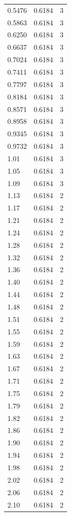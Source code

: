 \begin{longtable}{lrr}
  0.5476 & 0.6184 & 3 \\
  0.5863 & 0.6184 & 3 \\
  0.6250 & 0.6184 & 3 \\
  0.6637 & 0.6184 & 3 \\
  0.7024 & 0.6184 & 3 \\
  0.7411 & 0.6184 & 3 \\
  0.7797 & 0.6184 & 3 \\
  0.8184 & 0.6184 & 3 \\
  0.8571 & 0.6184 & 3 \\
  0.8958 & 0.6184 & 3 \\
  0.9345 & 0.6184 & 3 \\
  0.9732 & 0.6184 & 3 \\
  1.01 & 0.6184 & 3 \\
  1.05 & 0.6184 & 3 \\
  1.09 & 0.6184 & 3 \\
  1.13 & 0.6184 & 2 \\
  1.17 & 0.6184 & 2 \\
  1.21 & 0.6184 & 2 \\
  1.24 & 0.6184 & 2 \\
  1.28 & 0.6184 & 2 \\
  1.32 & 0.6184 & 2 \\
  1.36 & 0.6184 & 2 \\
  1.40 & 0.6184 & 2 \\
  1.44 & 0.6184 & 2 \\
  1.48 & 0.6184 & 2 \\
  1.51 & 0.6184 & 2 \\
  1.55 & 0.6184 & 2 \\
  1.59 & 0.6184 & 2 \\
  1.63 & 0.6184 & 2 \\
  1.67 & 0.6184 & 2 \\
  1.71 & 0.6184 & 2 \\
  1.75 & 0.6184 & 2 \\
  1.79 & 0.6184 & 2 \\
  1.82 & 0.6184 & 2 \\
  1.86 & 0.6184 & 2 \\
  1.90 & 0.6184 & 2 \\
  1.94 & 0.6184 & 2 \\
  1.98 & 0.6184 & 2 \\
  2.02 & 0.6184 & 2 \\
  2.06 & 0.6184 & 2 \\
  2.10 & 0.6184 & 2 \\

\end{longtable}
